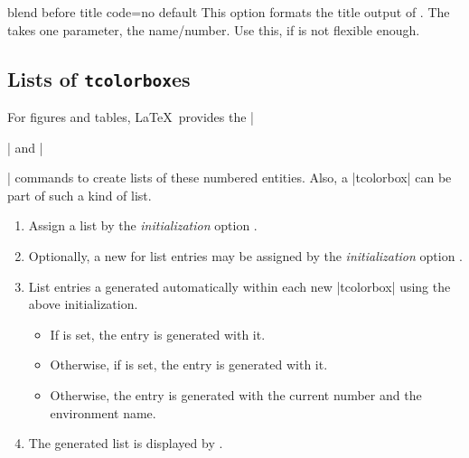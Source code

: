 \clearpage
\begin{docTcbKey}[][doc new=2015-03-13]{blend before title code}{=}{no default}
  This option formats the title output of .
  The  takes one parameter, the name/number.
  Use this, if  is not flexible enough.

{\tcbusetemp}
\end{docTcbKey}



\clearpage
\subsection{Lists of \texttt{tcolorbox}es}\label{sec:listsof}
For figures and tables, \LaTeX\ provides the |\listoffigures| and
|\listoftables| commands to create lists of these numbered entities.
Also, a |tcolorbox| can be part of such a kind of list.
\begin{enumerate}
\item Assign a list  by the \emph{initialization} option
  .
\item Optionally, a new  for list entries may be assigned
  by the \emph{initialization} option .
\item List entries a generated automatically within each new |tcolorbox|
  using the above initialization.
  \begin{itemize}
  \item If  is set, the entry is generated with it.
  \item Otherwise, if  is set, the entry is generated with it.
  \item Otherwise, the entry is generated with the current number and the environment name.
  \end{itemize}
\item The generated list is displayed by .
\end{enumerate}

